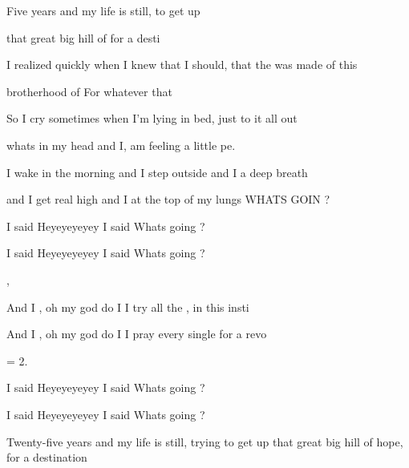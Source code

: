 
\zs
{} Five years and my life is still,  to get up 

that great big hill of  for a desti

I realized quickly when I knew that I should, that the  was made of this

brotherhood of  For whatever that 
\ks

\zs
{} So I cry sometimes when I'm lying in bed, just to  it all out

whats in my head and I,  am feeling a little pe.

 I wake in the morning and I step outside and I  a deep breath 

and I get real high and I  at the top of my lungs  WHATS GOIN ?
\ks

\zr
{} I said Heyeyeyeyey  I said  Whats going ?

 I said Heyeyeyeyey  I said  Whats going ?

,   ~ 

And I , oh my god do I  I try all the , in this insti

And I , oh my god do I  I pray every single  for a revo
\kr

\zs                      
= 2.
\ks

\zr
{} I said Heyeyeyeyey  I said  Whats going ?

 I said Heyeyeyeyey  I said  Whats going ?
\kr

\zs
Twenty-five years and my life is still, trying to get up 
that great big hill of hope, for a destination
\ks

\kp